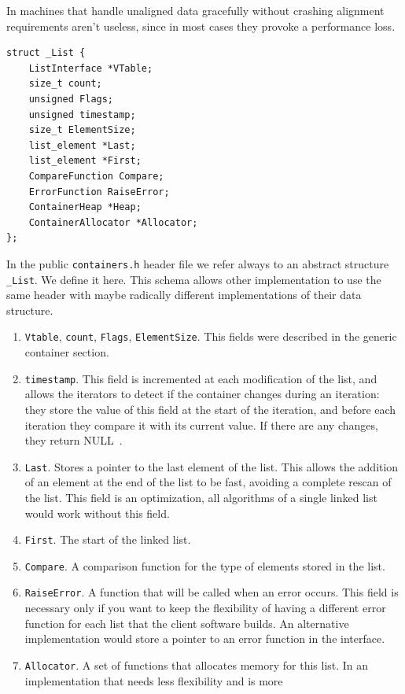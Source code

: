 \documentclass[12pt,a4paper]{memoir} %
\newif\iftth
\newcommand{\Null}{{\iftth \ NULL \else \footnotesize NULL\  \fi}}
\begin{document}
{{In machines that handle unaligned data gracefully without crashing alignment requirements aren't useless, since in most cases they 
provoke a performance loss.
\begin{verbatim}
struct _List {
    ListInterface *VTable;  
    size_t count;           
    unsigned Flags;	
    unsigned timestamp;   
    size_t ElementSize;   
    list_element *Last;   
    list_element *First;  
    CompareFunction Compare; 
    ErrorFunction RaiseError; 
    ContainerHeap *Heap;
    ContainerAllocator *Allocator;
};
\end{verbatim}
In the public \texttt{containers.h} header file we refer always to an abstract structure \texttt{\_List}. We define it here. This schema allows other 
implementation to use the same header with maybe radically different implementations of their data structure.
\begin{enumerate}
\item \texttt{Vtable}, \texttt{count}, \texttt{Flags}, \texttt{ElementSize}. This fields were described in the generic container section.
\item \texttt{timestamp}. This field is incremented at each modification of the list, and allows the iterators to detect if the container changes 
during an iteration: they store the value of this field at the start of the iteration, and before each iteration they compare it with its current 
value. If there are any changes, they return \Null.
\item \texttt{Last}. Stores a pointer to the last element of the list. This allows the addition of an element at the end of the list to be fast, 
avoiding a complete rescan of the list. This field is an optimization, all algorithms of a single linked list would work without this field.
\item \texttt{First}. The start of the linked list.
\item \texttt{Compare}. A comparison function for the type of elements stored in the list.
\item \texttt{RaiseError}. A function that will be called when an error occurs. This field is necessary only if you want to keep the flexibility of 
having a different error function for each list that the client software builds. An alternative implementation would store a pointer to an error 
function in the interface.
\item \texttt{Allocator}. A set of functions that allocates memory for this list. In an implementation that needs less flexibility and is more 

\end{enumerate}}}
\end{document}
